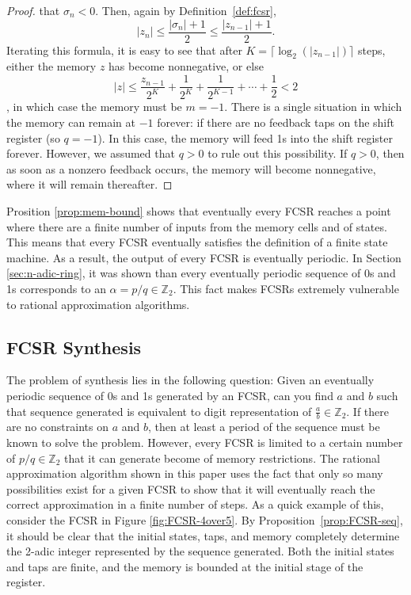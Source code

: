 \documentclass[english]{article}
\def\zzz{\mathbb{Z}}
\theoremstyle{plain}
\theoremstyle{definition}
\theoremstyle{remark}
\begin{document}
\begin{proof}
  that $\sigma_n<0$. Then, again by Definition~\ref{def:fcsr},
  \[
    |z_n|\leq\frac{|\sigma_n|+1}{2}\leq\frac{|z_{n-1}|+1}{2}.
  \]
  Iterating this formula, it is easy to see that after
  $K=\lceil\log_2(|z_{n-1}|)\rceil$ steps, either the memory $z$ has become
  nonnegative, or else
  \[
    |z|\leq\frac{z_{n-1}}{2^K}+\frac{1}{2^K}+\frac{1}{2^{K-1}}+\cdots+\frac{1}{2}<2
  \],
  in which case the memory must be $m=-1$. There is a single situation in which
  the memory can remain at $-1$ forever: if there are no feedback taps on the
  shift register (so $q=-1$). In this case, the memory will feed 1s into the
  shift register forever. However, we assumed that $q>0$ to rule out this
  possibility. If $q>0$, then as soon as a nonzero feedback occurs, the memory
  will become nonnegative, where it will remain thereafter.
\end{proof}

\par Prosition \ref{prop:mem-bound} shows that eventually every FCSR reaches
a point where there are a
finite number of inputs from the memory cells and of states. This means that
every FCSR eventually satisfies the definition of a finite state machine. As a
result, the output of every FCSR is eventually periodic. In Section
\ref{sec:n-adic-ring}, it was shown than every eventually periodic sequence of
0s and 1s corresponds to an $\alpha=p/q\in\zzz_2$. This fact makes FCSRs
extremely vulnerable to rational approximation algorithms.

\subsection{FCSR Synthesis}
\par The problem of synthesis lies in the following question: Given an eventually
periodic sequence of 0s and 1s generated by an FCSR, can you find $a$ and $b$
such that sequence generated is equivalent to digit representation of
$\frac{a}{b}\in\zzz_2$. If there are no constraints on $a$ and $b$, then 
at least a period of the sequence must be known to solve the problem. However,
every FCSR is limited to a certain number of $p/q\in\zzz_2$ that it can generate
become of memory restrictions. The rational approximation algorithm shown in this paper
uses the fact that only so many possibilities exist for a given FCSR to show
that it will eventually reach the correct approximation in a finite number of
steps.  As a quick example of this, consider the FCSR in Figure
\ref{fig:FCSR-4over5}. By Proposition~\ref{prop:FCSR-seq}, it should be clear
that the initial states, taps, and memory completely determine the 2-adic integer
represented by the sequence generated. Both the initial states and taps are
finite, and the memory is bounded at the initial stage of the register.
\end{document}
